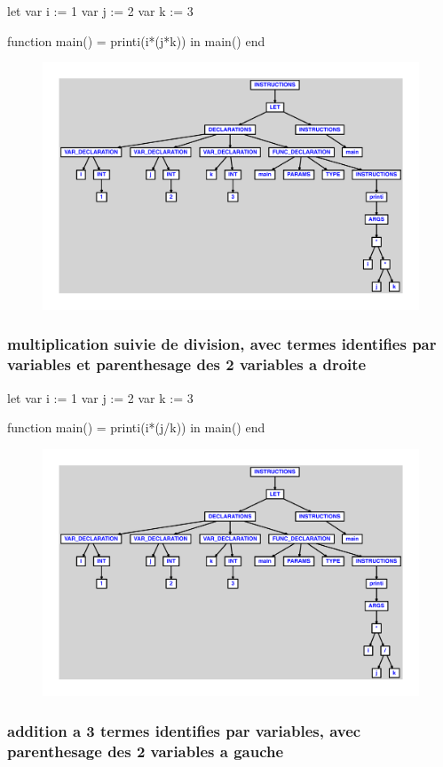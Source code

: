 \documentclass{article}
\begin{document}
\begin{verbatimtab}
let
	var i := 1
	var j := 2
	var k := 3

	function main() = printi(i*(j*k))
in main() end
\end{verbatimtab}
\begin{figure}[H]\centering\includegraphics[max width=\textwidth]{ast/ast_117.pdf}\end{figure}\subsubsection{multiplication suivie de division, avec termes identifies par variables et parenthesage des 2 variables a droite}
\begin{verbatimtab}
let
	var i := 1
	var j := 2
	var k := 3

	function main() = printi(i*(j/k))
in main() end
\end{verbatimtab}
\begin{figure}[H]\centering\includegraphics[max width=\textwidth]{ast/ast_118.pdf}\end{figure}\subsubsection{addition a 3 termes identifies par variables, avec parenthesage des 2 variables a gauche}
\end{document}

